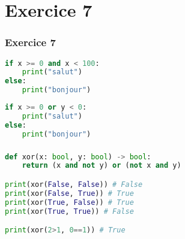 \documentclass[svgnames,11pt]{beamer}
\begin{document}
\section{Exercice 7}
\begin{frame}[fragile]
    \frametitle{Exercice 7}
    \begin{lstlisting}[language=Python  , xleftmargin=2em, xrightmargin=2em]
if x >= 0 and x < 100:
    print("salut")
else:
    print("bonjour")
\end{lstlisting}
    \begin{center}
    \end{center}

\end{frame}
\begin{frame}[fragile]
    \begin{lstlisting}[language=Python  , xleftmargin=2em, xrightmargin=2em]
if x >= 0 or y < 0:
    print("salut")
else:
    print("bonjour")
\end{lstlisting}
    \begin{center}
    \end{center}

\end{frame}
\begin{frame}[fragile]
    \frametitle{}

\begin{center}
\begin{lstlisting}[language=Python , basicstyle=\ttfamily\small, xleftmargin=2em, xrightmargin=2em]
def xor(x: bool, y: bool) -> bool:
    return (x and not y) or (not x and y)

print(xor(False, False)) # False
print(xor(False, True)) # True
print(xor(True, False)) # True
print(xor(True, True)) # False

print(xor(2>1, 0==1)) # True
\end{lstlisting}
\label{CODE}
\end{center}

\end{frame}
\end{document}
